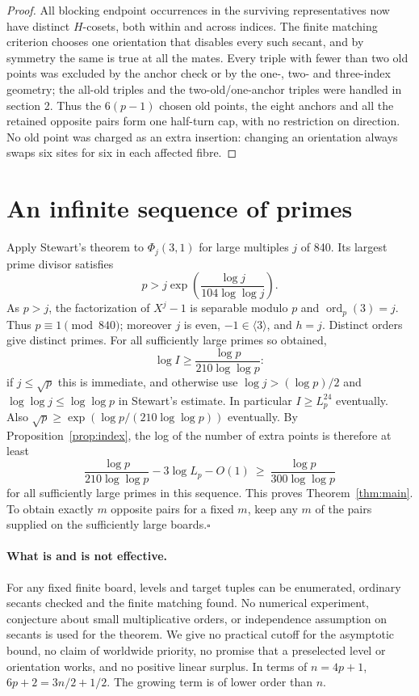 \documentclass[11pt]{article}
\begin{document}
\begin{proof}
All blocking endpoint occurrences in the surviving representatives now have distinct $H$-cosets, both within and across indices. The finite matching criterion chooses one orientation that disables every such secant, and by symmetry the same is true at all the mates. Every triple with fewer than two old points was excluded by the anchor check or by the one-, two- and three-index geometry; the all-old triples and the two-old/one-anchor triples were handled in section 2. Thus the $6(p-1)$ chosen old points, the eight anchors and all the retained opposite pairs form one half-turn cap, with no restriction on direction. No old point was charged as an extra insertion: changing an orientation always swaps six sites for six in each affected fibre.
\end{proof}

\section{An infinite sequence of primes}
Apply Stewart's theorem \cite[Theorem 1, (7)]{stewart} to $\Phi_j(3,1)$ for large multiples $j$ of 840. Its largest prime divisor satisfies
\[
 p> j\exp\!\left(\frac{\log j}{104\log\log j}\right).
\]
As $p>j$, the factorization of $X^j-1$ is separable modulo $p$ and $\operatorname{ord}_p(3)=j$. Thus $p\equiv1\pmod{840}$; moreover $j$ is even, $-1\in\langle3\rangle$, and $h=j$. Distinct orders give distinct primes. For all sufficiently large primes so obtained,
\[
 \log I\ge \frac{\log p}{210\log\log p}:
\]
if $j\le\sqrt p$ this is immediate, and otherwise use $\log j>(\log p)/2$ and $\log\log j\le\log\log p$ in Stewart's estimate. In particular $I\ge L_p^{24}$ eventually. Also $\sqrt p\ge \exp(\log p/(210\log\log p))$ eventually. By Proposition~\ref{prop:index}, the log of the number of extra points is therefore at least
\[
 \frac{\log p}{210\log\log p}-3\log L_p-O(1)
 \ \ge\ \frac{\log p}{300\log\log p}
\]
for all sufficiently large primes in this sequence. This proves Theorem~\ref{thm:main}. To obtain exactly $m$ opposite pairs for a fixed $m$, keep any $m$ of the pairs supplied on the sufficiently large boards.\hfill$\square$

\paragraph{What is and is not effective.} For any fixed finite board, levels and target tuples can be enumerated, ordinary secants checked and the finite matching found. No numerical experiment, conjecture about small multiplicative orders, or independence assumption on secants is used for the theorem. We give no practical cutoff for the asymptotic bound, no claim of worldwide priority, no promise that a preselected level or orientation works, and no positive linear surplus. In terms of $n=4p+1$, $6p+2=3n/2+1/2$. The growing term is of lower order than $n$.
\end{document}
